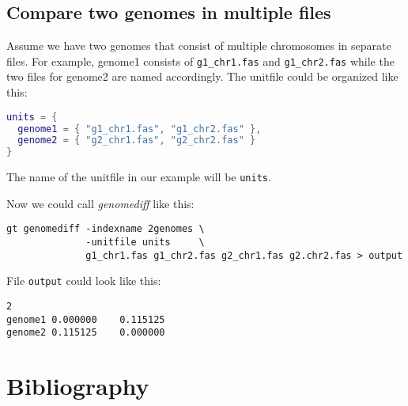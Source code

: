 \documentclass[12pt,titlepage]{article}
\newcommand{\Gdiff}{\textit{genomediff}\xspace}
\newcommand{\File}[1]{\texttt{\small #1}}
\begin{document}
\subsection{Compare two genomes in multiple files}
Assume we have two genomes that consist of multiple chromosomes in separate
files. For example, genome1 consists of \File{g1\_chr1.fas} and
\File{g1\_chr2.fas} while the two files for genome2 are named accordingly. The
unitfile could be organized like this:

\begin{lstlisting}[language=lua]
units = {
  genome1 = { "g1_chr1.fas", "g1_chr2.fas" },
  genome2 = { "g2_chr1.fas", "g2_chr2.fas" }
}
\end{lstlisting}
The name of the unitfile in our example will be \File{units}.

Now we could call \Gdiff like this:

\begin{lstlisting}
gt genomediff -indexname 2genomes \
              -unitfile units     \
              g1_chr1.fas g1_chr2.fas g2_chr1.fas g2.chr2.fas > output
\end{lstlisting}
File \File{output} could look like this:
\begin{verbatim}
2
genome1	0.000000	0.115125
genome2	0.115125	0.000000
\end{verbatim}

\section*{Bibliography}


\end{document}
